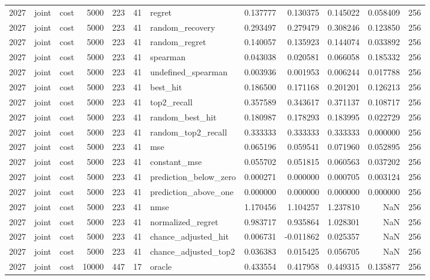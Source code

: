 \begin{tabular}{rllrrrlrrrrr}
2027 & joint & cost & 5000 & 223 & 41 & regret & 0.137777 & 0.130375 & 0.145022 & 0.058409 & 256 \\
2027 & joint & cost & 5000 & 223 & 41 & random_recovery & 0.293497 & 0.279479 & 0.308246 & 0.123850 & 256 \\
2027 & joint & cost & 5000 & 223 & 41 & random_regret & 0.140057 & 0.135923 & 0.144074 & 0.033892 & 256 \\
2027 & joint & cost & 5000 & 223 & 41 & spearman & 0.043038 & 0.020581 & 0.066058 & 0.185332 & 256 \\
2027 & joint & cost & 5000 & 223 & 41 & undefined_spearman & 0.003936 & 0.001953 & 0.006244 & 0.017788 & 256 \\
2027 & joint & cost & 5000 & 223 & 41 & best_hit & 0.186500 & 0.171168 & 0.201201 & 0.126213 & 256 \\
2027 & joint & cost & 5000 & 223 & 41 & top2_recall & 0.357589 & 0.343617 & 0.371137 & 0.108717 & 256 \\
2027 & joint & cost & 5000 & 223 & 41 & random_best_hit & 0.180987 & 0.178293 & 0.183995 & 0.022729 & 256 \\
2027 & joint & cost & 5000 & 223 & 41 & random_top2_recall & 0.333333 & 0.333333 & 0.333333 & 0.000000 & 256 \\
2027 & joint & cost & 5000 & 223 & 41 & mse & 0.065196 & 0.059541 & 0.071960 & 0.052895 & 256 \\
2027 & joint & cost & 5000 & 223 & 41 & constant_mse & 0.055702 & 0.051815 & 0.060563 & 0.037202 & 256 \\
2027 & joint & cost & 5000 & 223 & 41 & prediction_below_zero & 0.000271 & 0.000000 & 0.000705 & 0.003124 & 256 \\
2027 & joint & cost & 5000 & 223 & 41 & prediction_above_one & 0.000000 & 0.000000 & 0.000000 & 0.000000 & 256 \\
2027 & joint & cost & 5000 & 223 & 41 & nmse & 1.170456 & 1.104257 & 1.237810 & NaN & 256 \\
2027 & joint & cost & 5000 & 223 & 41 & normalized_regret & 0.983717 & 0.935864 & 1.028301 & NaN & 256 \\
2027 & joint & cost & 5000 & 223 & 41 & chance_adjusted_hit & 0.006731 & -0.011862 & 0.025357 & NaN & 256 \\
2027 & joint & cost & 5000 & 223 & 41 & chance_adjusted_top2 & 0.036383 & 0.015425 & 0.056705 & NaN & 256 \\
2027 & joint & cost & 10000 & 447 & 17 & oracle & 0.433554 & 0.417958 & 0.449315 & 0.135877 & 256 \\

\end{tabular}
